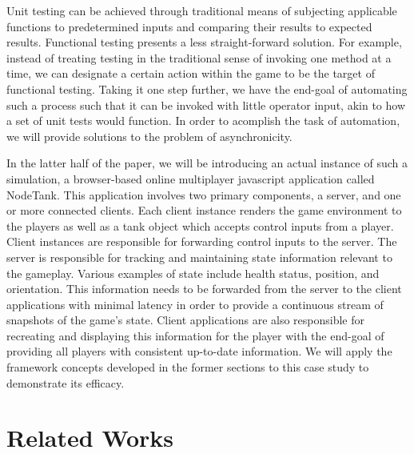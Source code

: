 \documentclass[conference]{IEEEtran}
\begin{document}
Unit testing can be achieved through traditional means of subjecting applicable functions to predetermined inputs and comparing their results to expected results. 
Functional testing presents a less straight-forward solution. For example, instead of treating testing in the traditional sense of invoking one method at a time,
we can designate a certain action within the game to be the target of functional testing. Taking it one step further, we have the end-goal of automating such a process such that 
it can be invoked with little operator input, akin to how a set of unit tests would function. In order to acomplish the task of automation, we will provide solutions to the problem
of asynchronicity.

In the latter half of the paper, we will be introducing an actual instance of such a simulation, a browser-based online multiplayer javascript application called NodeTank. 
This application involves two primary components, a server, and one or more connected clients. Each client instance renders the game environment to the players as well as a tank object which accepts control inputs from 
a player. Client instances are responsible for forwarding control inputs to the server. The server is responsible for tracking and maintaining state information relevant 
to the gameplay. Various examples of state include health status, position, and orientation. This information needs to be forwarded from the server to the client applications 
with minimal latency in order to provide a continuous stream of snapshots of the game’s state. Client applications are also responsible for recreating and displaying this 
information for the player with the end-goal of providing all players with consistent up-to-date information. We will apply the framework concepts developed in the former sections to this 
case study to demonstrate its efficacy.

\section{Related Works}
\end{document}
